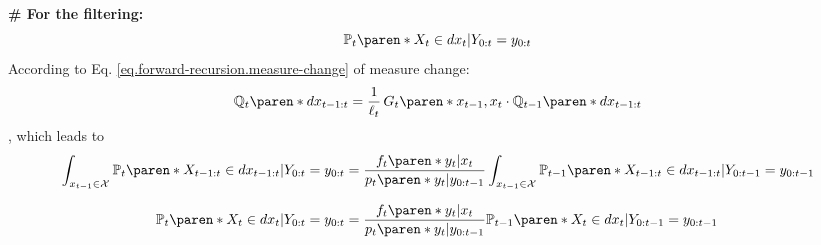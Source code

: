 \textbf{\# For the filtering:} \label{appendix.sec.bootstrap-filtering}
%
\begin{equation*}
    \mathbb{P}_{t} \paren*{ X_{t} \in dx_{t} \vert Y_{0:t} = y_{0:t}}
\end{equation*}
%
According to Eq. \eqref{eq.forward-recursion.measure-change} of measure change:
%
\begin{equation*}
    \mathbb{Q}_{t} \paren*{dx_{t-1:t}} =
        \dfrac{1}{\ell_{t}} \,
        G_{t} \paren*{x_{t-1}, x_{t}} \cdot
        \mathbb{Q}_{t-1} \paren*{dx_{t-1:t}}
\end{equation*}
%
, which leads to
%
\begin{align*}
    \int_{x_{t-1} \in \mathcal{X}} \mathbb{P}_{t}
        \paren*{ X_{t-1:t} \in dx_{t-1:t} \vert Y_{0:t} = y_{0:t}}
    &=
        \dfrac{
            f_{t} \paren*{ y_{t} \vert x_{t} }
        }{
            p_{t} \paren*{ y_{t} \vert y_{0:t-1} }
        }
        \int_{x_{t-1} \in \mathcal{X}} \mathbb{P}_{t-1}
            \paren*{ X_{t-1:t} \in dx_{t-1:t} \vert Y_{0:t-1} = y_{0:t-1}}
    \\[1.5ex]
    \mathbb{P}_{t} \paren*{ X_{t} \in dx_{t} \vert Y_{0:t} = y_{0:t}}
    &=
        \dfrac{
            f_{t} \paren*{ y_{t} \vert x_{t} }
        }{
            p_{t} \paren*{ y_{t} \vert y_{0:t-1} }
        }
        \mathbb{P}_{t-1} \paren*{ X_{t} \in dx_{t} \vert Y_{0:t-1} = y_{0:t-1}}
\end{align*}
